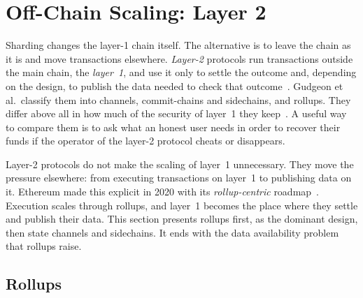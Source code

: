 \section{Off-Chain Scaling: Layer 2}\label{sec:bg:l2}


Sharding changes the layer-1 chain itself.
The alternative is to leave the chain as it is and move transactions elsewhere.
\emph{Layer-2} protocols run transactions outside the main chain, the \emph{layer~1}, and use it only to settle the outcome and, depending on the design, to publish the data needed to check that outcome~\cite{gudgeon2020sok}.
Gudgeon et al.\ classify them into channels, commit-chains and sidechains, and rollups. 
They differ above all in how much of the security of layer~1 they keep~\cite{gudgeon2020sok}.
A useful way to compare them is to ask what an honest user needs in order to recover their funds if the operator of the layer-2 protocol cheats or disappears.

Layer-2 protocols do not make the scaling of layer~1 unnecessary.
They move the pressure elsewhere: from executing transactions on layer~1 to publishing data on it.
Ethereum made this explicit in 2020 with its \emph{rollup-centric} roadmap~\cite{buterin2020rollupcentric}.
Execution scales through rollups, and layer~1 becomes the place where they settle and publish their data.
This section presents rollups first, as the dominant design, then state channels and sidechains.
It ends with the data availability problem that rollups raise.

\subsection{Rollups}\label{sec:bg:l2:rollups}


